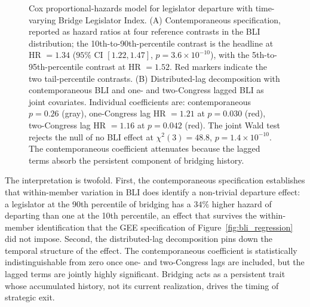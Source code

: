 \documentclass[12pt, a4paper]{article}
\begin{document}
\begin{figure}[H]
{
}
\caption{Cox proportional-hazards model for legislator departure with time-varying Bridge Legislator Index. (A) Contemporaneous specification, reported as hazard ratios at four reference contrasts in the BLI distribution; the 10th-to-90th-percentile contrast is the headline at HR $= 1.34$ ($95\%$ CI $[1.22, 1.47]$, $p = 3.6 \times 10^{-10}$), with the 5th-to-95th-percentile contrast at HR $= 1.52$. Red markers indicate the two tail-percentile contrasts. (B) Distributed-lag decomposition with contemporaneous BLI and one- and two-Congress lagged BLI as joint covariates. Individual coefficients are: contemporaneous $p = 0.26$ (gray), one-Congress lag HR $= 1.21$ at $p = 0.030$ (red), two-Congress lag HR $= 1.16$ at $p = 0.042$ (red). The joint Wald test rejects the null of no BLI effect at $\chi^2(3) = 48.8$, $p = 1.4 \times 10^{-10}$. The contemporaneous coefficient attenuates because the lagged terms absorb the persistent component of bridging history.}
\label{fig:cox_ph}
\end{figure}

The interpretation is twofold. First, the contemporaneous specification establishes that within-member variation in BLI does identify a non-trivial departure effect: a legislator at the 90th percentile of bridging has a $34\%$ higher hazard of departing than one at the 10th percentile, an effect that survives the within-member identification that the GEE specification of Figure~\ref{fig:bli_regression} did not impose. Second, the distributed-lag decomposition pins down the temporal structure of the effect. The contemporaneous coefficient is statistically indistinguishable from zero once one- and two-Congress lags are included, but the lagged terms are jointly highly significant. Bridging acts as a persistent trait whose accumulated history, not its current realization, drives the timing of strategic exit.
\end{document}
